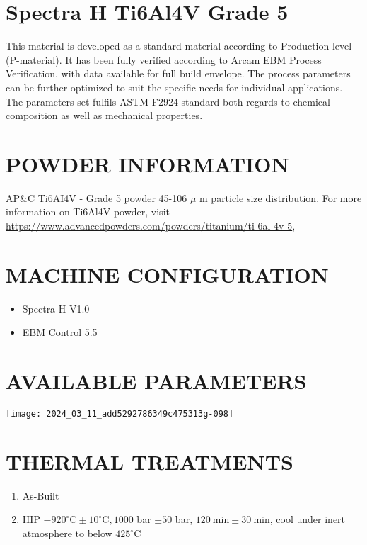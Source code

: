 \documentclass[10pt]{article}
\begin{document}
\section*{Spectra H Ti6Al4V Grade 5}
This material is developed as a standard material according to Production level (P-material). It has been fully verified according to Arcam EBM Process Verification, with data available for full build envelope. The process parameters can be further optimized to suit the specific needs for individual applications. The parameters set fulfils ASTM F2924 standard both regards to chemical composition as well as mechanical properties.

\section*{POWDER INFORMATION}
AP\&C Ti6AI4V - Grade 5 powder 45-106 $\mu$ m particle size distribution. For more information on Ti6Al4V powder, visit \href{https://www.advancedpowders.com/powders/titanium/ti-6al-4v-5}{https://www.advancedpowders.com/powders/titanium/ti-6al-4v-5},

\section*{MACHINE CONFIGURATION}
\begin{itemize}
  \item Spectra H-V1.0
  \item EBM Control 5.5
\end{itemize}

\section*{AVAILABLE PARAMETERS}
\begin{center}
\texttt{[image: 2024\_03\_11\_add5292786349c475313g-098]}
\end{center}

\section*{THERMAL TREATMENTS}
\begin{enumerate}
  \item As-Built

  \item HIP $-920^{\circ} \mathrm{C} \pm 10^{\circ} \mathrm{C}, 1000$ bar $\pm 50$ bar, $120 \mathrm{~min} \pm 30 \mathrm{~min}$, cool under inert atmosphere to below $425^{\circ} \mathrm{C}$

\end{enumerate}
\end{document}
